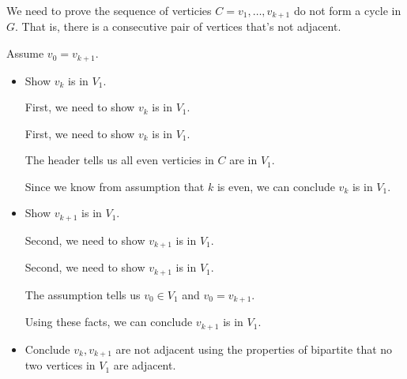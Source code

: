 \documentclass[12pt]{article}
\begin{document}
\begin{enumerate}[a.]
\begin{mdframed}
\begin{enumerate}[1.]
            \bigskip

            We need to prove the sequence of verticies $C = v_1,\dots,v_{k+1}$
            do not form a cycle in $G$. That is, there is a consecutive pair of
            vertices that's not adjacent.

            \bigskip

            Assume $v_0 = v_{k+1}$.

            \bigskip

            \begin{itemize}
                \item Show $v_k$ is in $V_1$.

                \bigskip

                First, we need to show $v_k$ is in $V_1$.

                \bigskip

                \begin{mdframed}
                First, we need to show $v_k$ is in $V_1$.

                \bigskip

                The header tells us all even verticies in $C$ are in $V_1$.

                \bigskip

                Since we know from assumption that $k$ is even, we can conclude
                $v_k$ is in $V_1$.
                \end{mdframed}

                \item Show $v_{k+1}$ is in $V_1$.

                \bigskip

                Second, we need to show $v_{k+1}$ is in $V_1$.

                \bigskip

                \begin{mdframed}
                Second, we need to show $v_{k+1}$ is in $V_1$.

                \bigskip

                The assumption tells us $v_0 \in V_1$ and $v_0 = v_{k+1}$.

                \bigskip

                Using these facts, we can conclude $v_{k+1}$ is in $V_1$.
                \end{mdframed}

                \item Conclude $v_k,v_{k+1}$ are not adjacent using the properties of bipartite
                that no two vertices in $V_1$ are adjacent.


\end{itemize}
\end{enumerate}
\end{mdframed}
\end{enumerate}
\end{document}
